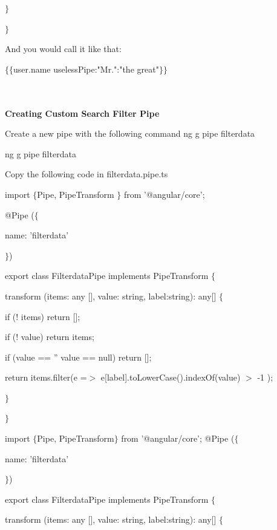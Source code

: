 \documentclass{article}
\begin{document}
 $\mathrm{\}}$

\noindent $\mathrm{\}}$

 And you would call it like that:

 $\mathrm{\{}$$\mathrm{\{}$user.name {\textbar} uselessPipe:"Mr.":"the great"$\mathrm{\}}$$\mathrm{\}}$

\noindent \\ \\ \textbf{Creating Custom Search Filter Pipe } \\

\noindent 

\noindent Create a new pipe with the following command ng g pipe filterdata \\

\noindent 

\noindent ng g pipe filterdata

\noindent 

\noindent Copy the following code in filterdata.pipe.ts

\noindent import $\mathrm{\{}$Pipe, PipeTransform $\mathrm{\}}$ from '@angular/core';

\noindent @Pipe ($\mathrm{\{}$

name: 'filterdata'

\noindent $\mathrm{\}}$)

\noindent export class FilterdataPipe implements PipeTransform $\mathrm{\{}$

transform (items: any [], value: string, label:string): any[] $\mathrm{\{}$ 

if (! items) return [];

if (! value) return items;

if (value == '' {\textbar}{\textbar} value == null) return [];

return items.filter(e =$\mathrm{>}$ e[label].toLowerCase().indexOf(value) $\mathrm{>}$ -1 );

$\mathrm{\}}$

\noindent $\mathrm{\}}$

\noindent import $\mathrm{\{}$Pipe, PipeTransform$\mathrm{\}}$ from '@angular/core'; @Pipe ($\mathrm{\{}$

\noindent name: 'filterdata'

\noindent $\mathrm{\}}$)

\noindent export class FilterdataPipe implements PipeTransform $\mathrm{\{}$ 

transform (items: any [], value: string, label:string): any[] $\mathrm{\{}$
\end{document}
